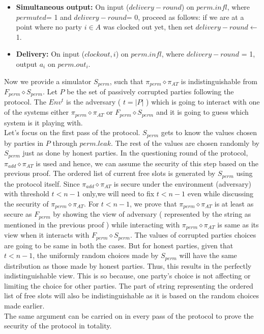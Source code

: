 \documentclass{llncs}
\begin{document}
\begin{framed}
\begin{itemize}
\item \textbf{Simultaneous output:} On input ($delivery-round$) on $perm.infl$, where $permuted$= 1 and $delivery-round$= 0, proceed as follows: if we are at a point where no party $i \in A$ was clocked out yet, then set $delivery-round\leftarrow$ 1.

\item \textbf{Delivery:} On input ($clockout, i$) on $perm.infl$, where $delivery-round$ = 1, output $a_i$ on $perm.out_i$.
\end{itemize}
\end{framed}
Now we provide a simulator $S_{perm}$, such that $\pi_{perm} \diamond \pi_{AT}$ is indistinguishable from $F_{perm} \diamond S_{perm}$. Let $P$ be  the set of passively corrupted parties following the protocol. The $Env^t$ is the adversary ( $t = |P|$ ) which is going to interact with one of the systems either $\pi_{perm} \diamond \pi_{AT}$ or $F_{perm} \diamond S_{perm}$  and it is going to guess which system is it playing with. \\

Let’s focus on the first pass of the protocol. $S_{perm}$ gets to know the values chosen by parties in $P$ through $perm.leak$. The rest of the values are chosen randomly by $S_{perm}$ just as done by honest parties. In the questioning round of the protocol, $\pi_{add} \diamond \pi_{AT}$ is used and hence, we can assume the security of this step based on the previous proof. The ordered list of current free slots is generated by $S_{perm}$ using the protocol itself. 
Since $\pi_{add} \diamond \pi_{AT}$ is secure under the environment (adversary) with threshold $t < n-1$ only,we will need to fix $t < n-1$ even  while discussing the security of $\pi_{perm} \diamond \pi_{AT}$. For $t < n-1$, we prove that $\pi_{perm} \diamond \pi_{AT}$ is at least as secure as $F_{perm}$ by showing the view of adversary ( represented by the string as mentioned in the previous proof ) while interacting with $\pi_{perm} \diamond \pi_{AT}$ is same as its view when it interacts with $F_{perm} \diamond S_{perm}$. The values of corrupted parties choices are going to be same in both the cases. But for honest parties, given that $t < n-1$, the uniformly random choices made by $S_{perm}$ will have the same distribution as those made by honest parties. Thus, this results in the perfectly indistinguishable view. This is so because, one party's choice is not affecting or limiting the choice for other parties. The part of string representing the ordered list of free slots will also be indistinguishable as it is based on the random choices made earlier.\\
The same argument can be carried on in every pass of the protocol to prove the security of the protocol in totality. 
\end{document}
